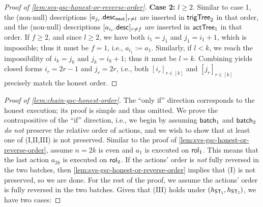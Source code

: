 \begin{proof}[Proof of \cref{lem:svs-gsc-honest-or-reverse-order}]
    \noindent\textbf{Case 2:} $l \geq 2$. Similar to case 1, the (non-null) descriptions $[a_{j_r}.\mathsf{desc_{next}}_{}]_{r \neq l}$ are inserted in $\mathsf{trigTree}_2$ in that order, and the (non-null) descriptions $[a_{i_r}.\mathsf{desc}_{}]_{r \neq f}$ are inserted in $\mathsf{actTree}_1$ in that order. If $f \geq 2$, and since $l \geq 2$, we have both $i_{1} = j_{1}$ and $j_{1} = i_{1} + 1$, which is impossible; thus it must be $f = 1$, i.e., $a_{i_1} := a_1$. Similarly, if $l < k$, we reach the impossibility of $i_{k} = j_{k}$ and $j_{k} = i_{k} + 1$; thus it must be $l = k$. Combining yields closed forms $i_r = 2r - 1$ and $j_r = 2r$, i.e., both $[i_r]_{r \in [k]}$ and $[j_r]_{r \in [k]}$ precisely match the honest order.
\end{proof}


\begin{proof}[Proof of \cref{lem:chain-gsc-honest-order}]
    The ``only if'' direction corresponds to the honest execution; its proof is simple and thus omitted. We prove the contrapositive of the ``if'' direction, i.e., we begin by assuming $\mathsf{batch}_{1}$ and $\mathsf{batch}_{2}$ \emph{do not} preserve the relative order of actions, and we wish to show that at least one of (I,II,III) is not preserved. 
    Similar to the proof of \cref{lem:svs-gsc-honest-or-reverse-order}, assume $n = 2k$ is even and $a_1$ is executed on $\mathsf{rol}_{1}$. This means that the last action $a_{2k}$ is executed on $\mathsf{rol}_{2}$. If the actions' order is \emph{not} fully reversed in the two batches, then \cref{lem:svs-gsc-honest-or-reverse-order} implies that (I) is not preserved, so we are done. For the rest of the proof, we assume the actions' order is fully reversed in the two batches. Given that (III) holds under $(h_{\mathsf{ST_{1}}}, h_{\mathsf{ST_{2}}})$, we have two cases:
    

\end{proof}

